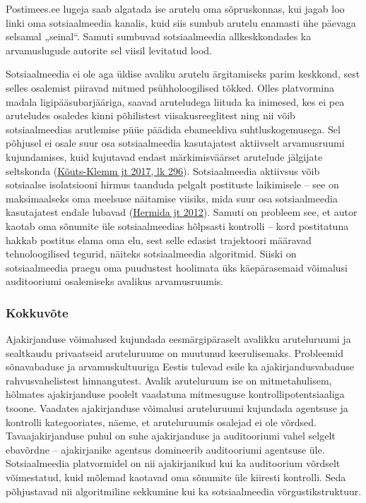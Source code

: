 \documentclass[estonian,]{article}
\begin{document}
Postimees.ee lugeja saab algatada ise arutelu oma sõpruskonnas, kui jagab loo linki oma sotsiaalmeedia kanalis, kuid siis sumbub arutelu enamasti ühe päevaga selsamal „seinal``. Samuti sumbuvad sotsiaalmeedia allkeskkondades ka arvamuslugude autorite sel viisil levitatud lood.

Sotsiaalmeedia ei ole aga üldise avaliku arutelu ärgitamiseks parim keskkond, sest selles osalemist piiravad mitmed psühholoogilised tõkked. Olles platvormina madala ligipääsubarjääriga, saavad aruteludega liituda ka inimesed, kes ei pea aruteludes osaledes kinni põhilistest viisakusreeglitest ning nii võib sotsiaalmeedias arutlemise püüe päädida ebameeldiva suhtluskogemusega. Sel põhjusel ei osale suur osa sotsiaalmeedia kasutajatest aktiivselt arvamusruumi kujundamises, kuid kujutavad endast märkimisväärset arutelude jälgijate seltskonda (\protect\hyperlink{Kuxf5uts-Klemm2017}{Kõuts-Klemm jt 2017, lk 296}). Sotsiaalmeedia aktiivsus võib sotsiaalse isolatsiooni hirmus taanduda pelgalt postituste laikimisele -- see on maksimaalseks oma meelsuse näitamise viisiks, mida suur osa sotsiaalmeedia kasutajatest endale lubavad (\protect\hyperlink{Hermida2012}{Hermida jt 2012}). Samuti on probleem see, et autor kaotab oma sõnumite üle sotsiaalmeedias hõlpsasti kontrolli -- kord postitatuna hakkab postitus elama oma elu, sest selle edasist trajektoori määravad tehnoloogilised tegurid, näiteks sotsiaalmeedia algoritmid. Siiski on sotsiaalmeedia praegu oma puudustest hoolimata üks käepärasemaid võimalusi auditooriumi osalemiseks avalikus arvamusruumis.

\hypertarget{kokkuvuxf5te-13}{%
\subsubsection*{Kokkuvõte}\label{kokkuvuxf5te-13}}

Ajakirjanduse võimalused kujundada eesmärgipäraselt avalikku aruteluruumi ja sealtkaudu privaatseid aruteluruume on muutunud keerulisemaks. Probleemid sõnavabaduse ja arvamuskultuuriga Eestis tulevad esile ka ajakirjandusvabaduse rahvusvahelistest hinnangutest. Avalik aruteluruum ise on mitmetahulisem, hõlmates ajakirjanduse poolelt vaadatuna mitmesuguse kontrollipotentsiaaliga tsoone. Vaadates ajakirjanduse võimalusi aruteluruumi kujundada agentsuse ja kontrolli kategooriates, näeme, et aruteluruumis osalejad ei ole võrdsed. Tavaajakirjanduse puhul on suhe ajakirjanduse ja auditooriumi vahel selgelt ebavõrdne -- ajakirjanike agentsus domineerib auditooriumi agentsuse üle. Sotsiaalmeedia platvormidel on nii ajakirjanikud kui ka auditoorium võrdselt võimestatud, kuid mõlemad kaotavad oma sõnumite üle kiiresti kontrolli. Seda põhjustavad nii algoritmiline sekkumine kui ka sotsiaalmeedia võrgustikstruktuur.
\end{document}
